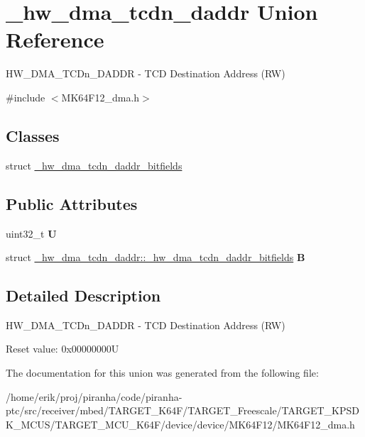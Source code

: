 \hypertarget{union__hw__dma__tcdn__daddr}{}\section{\+\_\+hw\+\_\+dma\+\_\+tcdn\+\_\+daddr Union Reference}
\label{union__hw__dma__tcdn__daddr}


H\+W\+\_\+\+D\+M\+A\+\_\+\+T\+C\+Dn\+\_\+\+D\+A\+D\+DR -\/ T\+CD Destination Address (RW)  




{\ttfamily \#include $<$M\+K64\+F12\+\_\+dma.\+h$>$}

\subsection*{Classes}
\begin{DoxyCompactItemize}
\item 
struct \hyperlink{struct__hw__dma__tcdn__daddr_1_1__hw__dma__tcdn__daddr__bitfields}{\+\_\+hw\+\_\+dma\+\_\+tcdn\+\_\+daddr\+\_\+bitfields}
\end{DoxyCompactItemize}
\subsection*{Public Attributes}
\begin{DoxyCompactItemize}
\item 
uint32\+\_\+t {\bfseries U}\hypertarget{union__hw__dma__tcdn__daddr_afe98719303db0874f862bb7e90c4b3f8}{}\label{union__hw__dma__tcdn__daddr_afe98719303db0874f862bb7e90c4b3f8}

\item 
struct \hyperlink{struct__hw__dma__tcdn__daddr_1_1__hw__dma__tcdn__daddr__bitfields}{\+\_\+hw\+\_\+dma\+\_\+tcdn\+\_\+daddr\+::\+\_\+hw\+\_\+dma\+\_\+tcdn\+\_\+daddr\+\_\+bitfields} {\bfseries B}\hypertarget{union__hw__dma__tcdn__daddr_ae151dad7fe77c244637ecb8d1a7076c5}{}\label{union__hw__dma__tcdn__daddr_ae151dad7fe77c244637ecb8d1a7076c5}

\end{DoxyCompactItemize}


\subsection{Detailed Description}
H\+W\+\_\+\+D\+M\+A\+\_\+\+T\+C\+Dn\+\_\+\+D\+A\+D\+DR -\/ T\+CD Destination Address (RW) 

Reset value\+: 0x00000000U 

The documentation for this union was generated from the following file\+:\begin{DoxyCompactItemize}
\item 
/home/erik/proj/piranha/code/piranha-\/ptc/src/receiver/mbed/\+T\+A\+R\+G\+E\+T\+\_\+\+K64\+F/\+T\+A\+R\+G\+E\+T\+\_\+\+Freescale/\+T\+A\+R\+G\+E\+T\+\_\+\+K\+P\+S\+D\+K\+\_\+\+M\+C\+U\+S/\+T\+A\+R\+G\+E\+T\+\_\+\+M\+C\+U\+\_\+\+K64\+F/device/device/\+M\+K64\+F12/M\+K64\+F12\+\_\+dma.\+h\end{DoxyCompactItemize}
